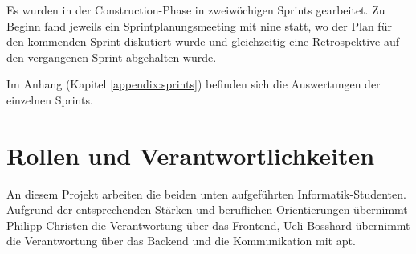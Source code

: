 Es wurden in der Construction-Phase in zweiwöchigen Sprints gearbeitet. Zu Beginn fand jeweils ein Sprintplanungsmeeting mit \gls{nine} statt, wo der Plan für den kommenden Sprint diskutiert wurde und gleichzeitig eine Retrospektive auf den vergangenen Sprint abgehalten wurde.

Im Anhang (Kapitel \ref{appendix:sprints}) befinden sich die Auswertungen der einzelnen Sprints.


\section{Rollen und Verantwortlichkeiten}

An diesem Projekt arbeiten die beiden unten aufgeführten Informatik-Studenten. Aufgrund der entsprechenden Stärken und beruflichen Orientierungen übernimmt Philipp Christen die Verantwortung über das Frontend, Ueli Bosshard übernimmt die Verantwortung über das Backend und die Kommunikation mit apt.

